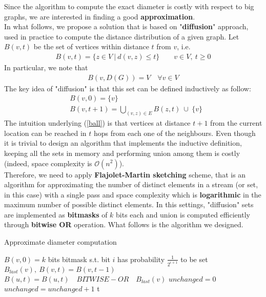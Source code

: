Since the algorithm to compute the exact diameter is costly with respect to big graphs, we are interested in finding a good \textbf{approximation}.\\
In what follows, we propose a solution that is based on "\textbf{diffusion}" approach, used in practice to compute the distance distribution of a given graph. Let $B(v,t)$ be the set of vertices within distance $t$ from $v$, i.e.
\begin{align*}
B(v,t) = \{ z \in V \ | \ d(v,z) \le t \} \qquad v \in V, \ t \ge 0
\end{align*}
In particular, we note that
\begin{align}
B(v,D(G)) = V \quad \forall v \in V \label{ball_diameter}
\end{align}
The key idea of "diffusion" is that this set can be defined inductively as follow:
\begin{align}
&B(v,0) = \{ v \} \nonumber\\
&B(v,t+1) = \bigcup_{(v,z) \in E} B(z,t) \ \cup \ \{ v \} \label{ball}
\end{align}
The intuition underlying (\ref{ball}) is that vertices at distance $t+1$ from the current location can be reached in $t$ hops from each one of the neighbours. Even though it is trivial to design an algorithm that implements the inductive definition, keeping all the sets in memory and performing union among them is costly (indeed, space complexity is $\mathcal{O}(n^2)$).\\
Therefore, we need to apply \textbf{Flajolet-Martin sketching}\cite{fm} scheme, that is an algorithm for approximating the number of distinct elements in a stream (or set, in this case) with a single pass and space complexity which is \textbf{logarithmic} in the maximum number of possible distinct elements. In this settings, "diffusion" sets are implemented as \textbf{bitmasks} of $k$ bits each and union is computed efficiently through \textbf{bitwise OR} operation. What follows is the algorithm we designed.
\medskip
\begin{algorithm}
\caption{Approximate diameter computation}
\begin{algorithmic}[1]
		\State $B(v,0) = k$ bits bitmask s.t. bit $i$ has probability $\frac{1}{2^{i+1}}$ to be set
	\EndFor
			\State $B_{last}(v), \ B(v,t) = B(v,t-1)$
		\EndFor
			\State $B(u,t) = B(u,t) \quad BITWISE-OR \quad B_{last}(v)$
		\EndFor
		\State $unchanged = 0$
				\State $unchanged = unchanged + 1$
			\EndIf
		\EndFor
			\State \Return t 
		\EndIf
	\EndFor
\end{algorithmic}
\end{algorithm}

